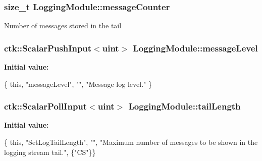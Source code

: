 \subsubsection[{\texorpdfstring{message\+Counter}{messageCounter}}]{\setlength{\rightskip}{0pt plus 5cm}size\+\_\+t Logging\+Module\+::message\+Counter}\hypertarget{structLoggingModule_a30626e4224e872a8b8ea94f4b3df810f}{}\label{structLoggingModule_a30626e4224e872a8b8ea94f4b3df810f}
Number of messages stored in the tail 
\subsubsection[{\texorpdfstring{message\+Level}{messageLevel}}]{\setlength{\rightskip}{0pt plus 5cm}ctk\+::\+Scalar\+Push\+Input$<$uint$>$ Logging\+Module\+::message\+Level}\hypertarget{structLoggingModule_aff12a4b08ef4ae4992880cdb953a3544}{}\label{structLoggingModule_aff12a4b08ef4ae4992880cdb953a3544}
{\bfseries Initial value\+:}
\begin{DoxyCode}
\{ \textcolor{keyword}{this}, \textcolor{stringliteral}{"messageLevel"}, \textcolor{stringliteral}{""},
        \textcolor{stringliteral}{"Message log level."} \}
\end{DoxyCode}
\subsubsection[{\texorpdfstring{tail\+Length}{tailLength}}]{\setlength{\rightskip}{0pt plus 5cm}ctk\+::\+Scalar\+Poll\+Input$<$uint$>$ Logging\+Module\+::tail\+Length}\hypertarget{structLoggingModule_a04e42940e162a4b5788bfc837f5a0854}{}\label{structLoggingModule_a04e42940e162a4b5788bfc837f5a0854}
{\bfseries Initial value\+:}
\begin{DoxyCode}
\{ \textcolor{keyword}{this}, \textcolor{stringliteral}{"SetLogTailLength"}, \textcolor{stringliteral}{""},
      \textcolor{stringliteral}{"Maximum number of messages to be shown in the logging stream tail."},
  \{\textcolor{stringliteral}{"CS"}\}\}
\end{DoxyCode}
